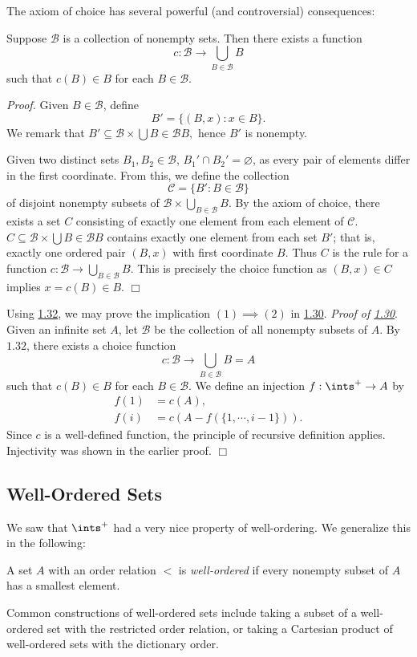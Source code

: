 The axiom of choice has several powerful (and controversial) consequences:
\begin{lemma}\label{1.32}
    Suppose $\mathcal{B}$ is a collection of nonempty sets. Then there exists a function
    $$c: \mathcal{B} \rightarrow \bigcup_{B \in \mathcal{B}}B$$
    such that $c(B) \in B$ for each $B \in \mathcal{B}$.
\end{lemma}
{\it Proof.} Given $B \in \mathcal{B}$, define 
$$B' = \{(B, x) : x \in B\}.$$
We remark that $B' \subseteq \mathcal{B} \times \bigcup{B \in \mathcal{B}} B,$ hence $B'$ is nonempty.

Given two distinct sets $B_1, B_2 \in \mathcal{B}$, $B_1' \cap B_2' = \varnothing$, as every pair of elements differ in the first coordinate. From this, we define the collection
$$\mathcal{C} = \{B': B \in \mathcal{B}\}$$
of disjoint nonempty subsets of $\mathcal{B} \times \bigcup_{B\in \mathcal{B}}B$. By the axiom of choice, there exists a set $C$ consisting of exactly one element from each element of $\mathcal{C}$. $C \subseteq \mathcal{B} \times \bigcup{B \in \mathcal{B}} B$ contains exactly one element from each set $B'$; that is, exactly one ordered pair $(B, x)$ with first coordinate $B$. Thus $C$ is the rule for a function $c: \mathcal{B} \rightarrow \bigcup_{B \in \mathcal{B}}B$. This is precisely the choice function as $(B, x) \in C$ implies $x = c(B) \in B$. $\Box$

Using \hyperref[1.32]{1.32}, we may prove the implication $(1) \implies (2)$ in \hyperref[1.30]{1.30}.
{\it Proof of \hyperref[1.30]{1.30}}. Given an infinite set $A$, let $\mathcal{B}$ be the collection of all nonempty subsets of $A$. By $\hyperref[1.32]{1.32}$, there exists a choice function
$$c: \mathcal{B} \rightarrow \bigcup_{B \in \mathcal{B}}B = A$$
such that $c(B) \in B$ for each $B \in \mathcal{B}$. We define an injection $f: \ints^+ \rightarrow A$ by
\begin{align*}
    f(1) &= c(A), \\
    f(i) &= c(A - f(\{1, \cdots, i-1\})).
\end{align*}
Since $c$ is a well-defined function, the principle of recursive definition applies. Injectivity was shown in the earlier proof. $\Box$

\subsection{Well-Ordered Sets}
We saw that $\ints^+$ had a very nice property of well-ordering. We generalize this in the following:
\begin{definition}\label{1.33}
    A set $A$ with an order relation $<$ is {\it well-ordered} if every nonempty subset of $A$ has a smallest element.
\end{definition}
Common constructions of well-ordered sets include taking a subset of a well-ordered set with the restricted order relation, or taking a Cartesian product of well-ordered sets with the dictionary order.

